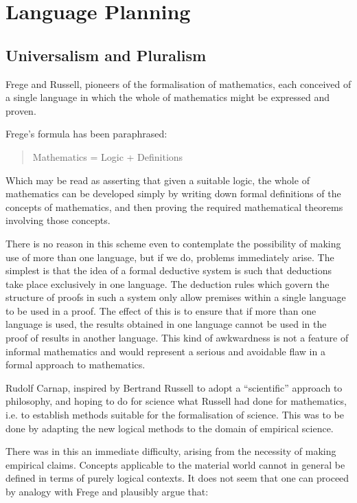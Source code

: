 
\chapter{Language Planning}\label{LanguagePlanning}

\section{Universalism and Pluralism}

Frege and Russell, pioneers of the formalisation of mathematics, each
conceived of a single language in which the whole of mathematics might
be expressed and proven.

Frege's formula has been paraphrased:

\begin{quote}
Mathematics = Logic + Definitions
\end{quote}

Which may be read as asserting that given a suitable logic, the whole
of mathematics can be developed simply by writing down formal
definitions of the concepts of mathematics, and then proving the
required mathematical theorems involving those concepts.

There is no reason in this scheme even to contemplate the possibility
of making use of more than one language, but if we do, problems
immediately arise.
The simplest is that the idea of a formal deductive system is such
that deductions take place exclusively in one language.
The deduction rules which govern the structure of proofs in such a
system only allow premises within a single language to be used in a
proof.
The effect of this is to ensure that if more than one language is
used, the results obtained in one language cannot be used in the proof
of results in another language.
This kind of awkwardness is not a feature of informal mathematics and
would represent a serious and avoidable flaw in a formal approach to
mathematics. 

Rudolf Carnap, inspired by Bertrand Russell to adopt a ``scientific''
approach to philosophy, and hoping to do for science what Russell had
done for mathematics, i.e. to establish methods suitable for the
formalisation of science.
This was to be done by adapting the new logical methods to the domain
of empirical science.

There was in this an immediate difficulty, arising from the necessity
of making empirical claims.
Concepts applicable to the material world cannot in general be defined
in terms of purely logical contexts.
It does not seem that one can proceed by analogy with Frege and
plausibly argue that:

